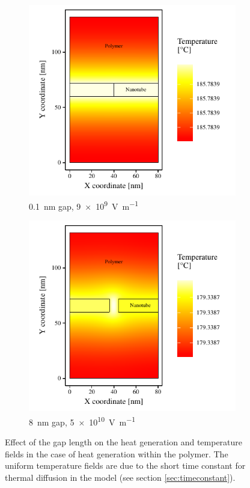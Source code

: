 \documentclass[11pt,review,times]{article}
\begin{document}
\begin{figure}[htb]
	\begin{subfigure}{0.49\textwidth}
		\centering
		\captionsetup{width=0.9\textwidth}
		\includegraphics[width=\textwidth]{resultats_0,1nm_comsol_2D_temp}
		\caption{\SI{0.1}{\nano\metre} gap, \SI{9e9}{\volt\per\metre}}
		\label{fig:result_gap01nm_temp}		
	\end{subfigure} 
	\begin{subfigure}{0.49\textwidth}
		\centering
		\captionsetup{width=0.9\textwidth}
		\includegraphics[width=\textwidth]{resultats_8nm_comsol_2D_temp}
		\caption{\SI{8}{\nano\metre} gap, \SI{5e10}{\volt\per\metre}}
		\label{fig:result_gap8nm_temp}		
	\end{subfigure}
	\caption{Effect of the gap length on the heat generation and temperature fields in the case of heat generation within the polymer. The uniform temperature fields are due to the short time constant for thermal diffusion in the model (see section \ref{sec:timeconstant}). \cite{Brassard2018_figshare_article1}}
	\label{fig:result_gap}
\end{figure}
\end{document}
